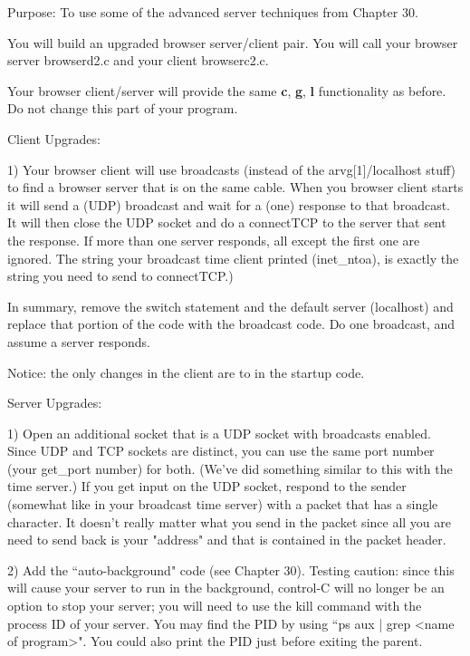 

\parindent 0pt

Purpose: To use some of the advanced server techniques from
Chapter 30.

You will build an upgraded browser server/client pair.
You will call your browser server {\ltt{}browserd2.c}
and your client {\ltt{}browserc2.c}.

Your browser client/server will provide the same {\bf c}, {\bf g},
{\bf l} functionality as before.
Do not change this part of your program.

Client Upgrades:

1) Your browser client will use broadcasts (instead of the
{\ltt{}arvg[1]}/{\ltt{}localhost} stuff) to find a browser
server that is on the same cable.
When you browser client starts it will send a (UDP) broadcast and
wait for a (one) response to that broadcast. It will then close
the UDP socket and do a {\ltt{}connectTCP} to the server that
sent the response. If more than one server responds, all except
the first one are ignored.
The string your broadcast time client printed ({\ltt{}inet_ntoa}),
is exactly the string you need to send to {\ltt{}connectTCP}.)

In summary, remove the switch statement and the default
server ({\ltt{}localhost}) and replace that portion of the code
with the broadcast code.
Do one broadcast, and assume a server responds.

Notice: the only changes in the client are to in the startup code.

Server Upgrades:

1) Open an additional socket that is a UDP socket with broadcasts enabled.
Since UDP and TCP sockets are distinct, you can use the same port number
(your {\ltt{}get_port} number) for both.
(We've did something similar to this with the time server.)
If you get input on the UDP socket, respond to the sender (somewhat like in your
broadcast time server) with a packet that has a single character.
It doesn't really matter what you send in the packet
since all you are need to send back is your "address" and
that is contained in the packet header.


2) Add the ``auto-background" code (see Chapter 30).
Testing caution: since this will cause your server to run in the background,
control-C will no longer be an option to stop your server; you will
need to use the {\ltt{}kill} command with the process ID of your server.
You may find the PID by using ``ps aux | grep <name of program>". You could also print the PID just before exiting the parent.  

